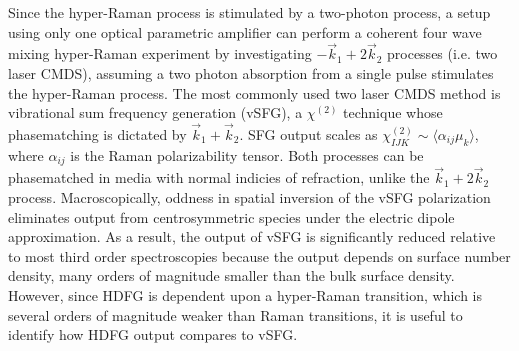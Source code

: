 \documentclass[aip, jcp, reprint, onecolumn]{revtex4-2}
\begin{document}
Since the hyper-Raman process is stimulated by a two-photon process, a setup using only one optical parametric amplifier can perform a coherent four wave mixing hyper-Raman experiment by investigating $-\vec{k}_1 + 2\vec{k}_2$ processes (i.e. two laser CMDS), assuming a two photon absorption from a single pulse stimulates the hyper-Raman process.
The most commonly used two laser CMDS method is vibrational sum frequency generation (vSFG), a $\chi^{(2)}$ technique whose phasematching is dictated by $\vec{k}_1 + \vec{k}_2$.
SFG output scales as $\chi^{(2)}_{IJK} \sim \langle \alpha_{ij} \mu_k \rangle$, where $\alpha_{ij}$ is the Raman polarizability tensor.
Both processes can be phasematched in media with normal indicies of refraction, unlike the $\vec{k}_1 + 2\vec{k}_2$ process.\cite{RN120}
Macroscopically, oddness in spatial inversion of the vSFG polarization eliminates output from centrosymmetric species under the electric dipole approximation.\cite{RN132, RN133}
As a result, the output of vSFG is significantly reduced relative to most third order spectroscopies because the output depends on surface number density, many orders of magnitude smaller than the bulk surface density. 
However, since HDFG is dependent upon a hyper-Raman transition, which is several orders of magnitude weaker than Raman transitions,\cite{RN515} it is useful to identify how HDFG output compares to vSFG.
\end{document}
